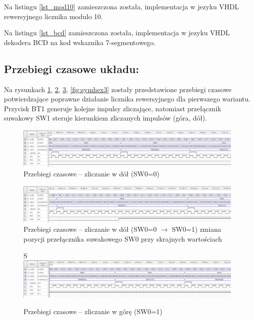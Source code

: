 \documentclass{classrep}
\begin{document}
Na listingu \ref{lst_mod10} zamieszczona została, implementacja w jezyku VHDL rewersyjnego licznika modulo 10. 



Na listingu \ref{lst_bcd} zamieszczona została, implementacja w jezyku VHDL dekodera BCD na kod wskaznika 7-segmentowego. 




\subsection{Przebiegi czasowe układu:}
Na rysunkach \ref{fig:symhex0}, \ref{fig:symhex1}, \ref{fig:symhex2}, \ref{fig:symhex3} zostały przedstawione przebiegi czasowe potwierdzające poprawne działanie
licznika rewersyjnego dla pierwszego wariantu. Przycisk BT1 generuje kolejne impulsy zliczające,
natomiast przełącznik suwakowy SW1 steruje kierunkiem zliczanych impulsów (góra, dół).


\begin{figure}[H]
	\centering
	\includegraphics[width=1.0\linewidth]{up_down_1}
	\caption{Przebiegi czasowe – zliczanie w dół (SW0=0)}
	\label{fig:symhex0}
\end{figure}



\begin{figure}[H]
	\centering
	\includegraphics[width=1.0\linewidth]{up_down_2}
	\caption{Przebiegi czasowe – zliczanie w dół (SW0=0 $\longrightarrow$ SW0=1) zmiana pozycji przełącznika suwakowego SW0 przy skrajnych wartościach	}
	\label{fig:symhex1}
\end{figure}



\begin{figure}[H]

S	\centering
	\includegraphics[width=1.0\linewidth]{up_down_inv_1}
	\caption{Przebiegi czasowe – zliczanie w górę (SW0=1) }
	\label{fig:symhex2}
\end{figure}
\end{document}
